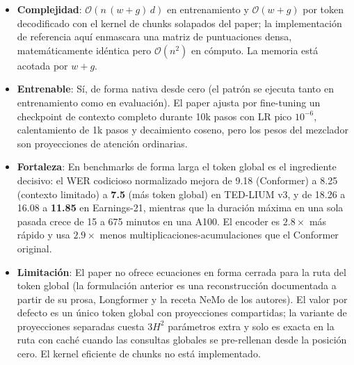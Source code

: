 \begin{itemize}[leftmargin=*]
    \item \textbf{Complejidad}: $\mathcal{O}(n\,(w+g)\,d)$ en entrenamiento y $\mathcal{O}(w+g)$ por token decodificado con el kernel de chunks solapados del paper; la implementación de referencia aquí enmascara una matriz de puntuaciones densa, matemáticamente idéntica pero $\mathcal{O}(n^2)$ en cómputo. La memoria está acotada por $w+g$.
    \item \textbf{Entrenable}: Sí, de forma nativa desde cero (el patrón se ejecuta tanto en entrenamiento como en evaluación). El paper ajusta por fine-tuning un checkpoint de contexto completo durante 10k pasos con LR pico $10^{-6}$, calentamiento de 1k pasos y decaimiento coseno, pero los pesos del mezclador son proyecciones de atención ordinarias.
    \item \textbf{Fortaleza}: En benchmarks de forma larga el token global es el ingrediente decisivo: el WER codicioso normalizado mejora de 9.18 (Conformer) a 8.25 (contexto limitado) a \textbf{7.5} (más token global) en TED-LIUM v3, y de 18.26 a 16.08 a \textbf{11.85} en Earnings-21, mientras que la duración máxima en una sola pasada crece de 15 a 675 minutos en una A100. El encoder es $2.8\times$ más rápido y usa $2.9\times$ menos multiplicaciones-acumulaciones que el Conformer original.
    \item \textbf{Limitación}: El paper no ofrece ecuaciones en forma cerrada para la ruta del token global (la formulación anterior es una reconstrucción documentada a partir de su prosa, Longformer y la receta NeMo de los autores). El valor por defecto es un único token global con proyecciones compartidas; la variante de proyecciones separadas cuesta $3H^2$ parámetros extra y solo es exacta en la ruta con caché cuando las consultas globales se pre-rellenan desde la posición cero. El kernel eficiente de chunks no está implementado.
\end{itemize}
